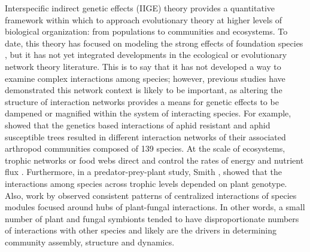\documentclass[11pt,twocolumn,twoside,lineno]{pnas-new}
\begin{document}
Interspecific indirect genetic effects (IIGE) theory provides a
quantitative framework within which to approach evolutionary theory at
higher levels of biological organization: from populations to
communities and ecosystems. To date, this theory has focused on
modeling the strong effects of foundation species
\cite{Shuster2006COMMUNITYSTRUCTURE, Whitham2012}, but it has not yet
integrated developments in the ecological or evolutionary network
theory literature. This is to say that it has not developed a way to
examine complex interactions among species; however, previous studies
have demonstrated this network context is likely to be important, as
altering the structure of interaction networks provides a means for
genetic effects to be dampened or magnified within the system of
interacting species. For example, \citep{Keith2017} showed that the
genetics based interactions of aphid resistant and aphid susceptible
trees resulted in different interaction networks of their associated
arthropod communities composed of 139 species. At the scale of
ecosystems, trophic networks or food webs direct and control the rates
of energy and nutrient flux \cite{Borgatti2006}. Furthermore, in a
predator-prey-plant study, Smith \cite{Smith2011}, showed that the
interactions among species across trophic levels depended on plant
genotype. Also, work by \citep{Toju2017, Toju2016, Toju2014a} observed
consistent patterns of centralized interactions of species modules
focused around hubs of plant-fungal interactions. In other words, a
small number of plant and fungal symbionts tended to have
disproportionate numbers of interactions with other species and likely
are the drivers in determining community assembly, structure and
dynamics.
\end{document}
